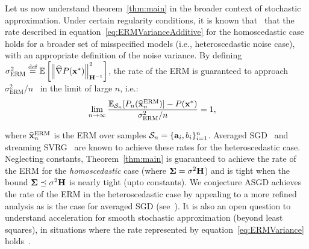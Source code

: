 Let us now understand theorem~\ref{thm:main} in the broader context of stochastic approximation. Under certain regularity conditions, it is known that~\citep{lehmann1998theory,Vaart00} that the rate described in equation~\ref{eq:ERMVarianceAdditive} for the homoscedastic case holds for a broader set of misspecified models (i.e., heteroscedastic noise case), with an appropriate definition of the noise variance. By defining $\sigma^2_{\textrm{ERM}}\stackrel{\textrm{def}}{=}\mathbb{E}\left[\left\| \widehat{\nabla}P(\mathbf{x}^*) \right\|^2_{{\mathbf{H}}^{-1}}\right]$, the rate of the ERM is guaranteed to approach $\sigma^2_{\textrm{ERM}}/n$~\citep{lehmann1998theory,Vaart00} in the limit of large $n$, i.e.:\vspace*{-2mm} 
\begin{align}
\label{eq:ERMVariance}
	\lim_{n\to\infty}\frac{\mathbb{E}_{\mathcal{S}_n}[P_n(\widehat{\mathbf{x}}_n^{\textrm{ERM}})]-P(\mathbf{x}^*)}{\sigma^2_{\textrm{ERM}}/n} &= 1,
\end{align}

\vspace{-0.2cm}
\noindent where $\widehat{\mathbf{x}}_n^{\textrm{ERM}}$ is the ERM over samples $\mathcal{S}_n=\{\mathbf{a}_i,b_i\}_{i=1}^n$. Averaged SGD~\citep{JainKKNS16} and streaming SVRG~\citep{FrostigGKS15} are known to achieve these rates for the heteroscedastic case. \iffalse Refer to~\cite{FrostigGKS15} for more details.\fi Neglecting constants, Theorem~\ref{thm:main} is guaranteed to achieve the rate of the ERM for the {\em homoscedastic} case (where $\mathbf{\Sigma}=\sigma^2\mathbf{H}$) and is tight when the bound $\mathbf{\Sigma}\preceq\sigma^2\mathbf{H}$ is nearly tight (upto constants). We conjecture ASGD achieves the rate of the ERM in the heteroscedastic case by appealing to a more refined analysis as is the case for averaged SGD (see~\cite{JainKKNS16}). It is also an open question to understand acceleration for smooth stochastic approximation (beyond least squares), in situations where the rate represented by equation~\ref{eq:ERMVariance} holds~\citep{PolyakJ92}.
\vspace{-3mm}
\iffalse
Other questions include simplifying the analysis of the proposed algorithm. It is also an important open question to understand the behavior of acceleration for smooth stochastic approximation problems going beyond least squares regression, where the rate represented by equation~\ref{eq:ERMVariance} holds.\fi
